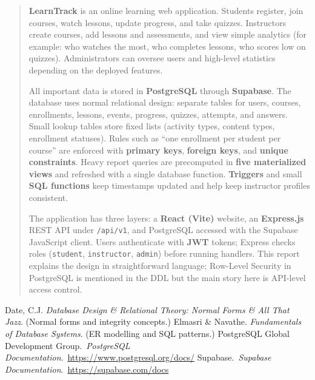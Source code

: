 \documentclass[12pt,a4paper]{report}
\begin{document}
\begin{abstract}
\textbf{LearnTrack} is an online learning web application. Students register, join courses, watch lessons, update progress, and take quizzes. Instructors create courses, add lessons and assessments, and view simple analytics (for example: who watches the most, who completes lessons, who scores low on quizzes). Administrators can oversee users and high-level statistics depending on the deployed features.

All important data is stored in \textbf{PostgreSQL} through \textbf{Supabase}. The database uses normal relational design: separate tables for users, courses, enrollments, lessons, events, progress, quizzes, attempts, and answers. Small lookup tables store fixed lists (activity types, content types, enrollment statuses). Rules such as ``one enrollment per student per course'' are enforced with \textbf{primary keys}, \textbf{foreign keys}, and \textbf{unique constraints}. Heavy report queries are precomputed in \textbf{five materialized views} and refreshed with a single database function. \textbf{Triggers} and small \textbf{SQL functions} keep timestamps updated and help keep instructor profiles consistent.

The application has three layers: a \textbf{React (Vite)} website, an \textbf{Express.js} REST API under \texttt{/api/v1}, and PostgreSQL accessed with the Supabase JavaScript client. Users authenticate with \textbf{JWT} tokens; Express checks roles (\texttt{student}, \texttt{instructor}, \texttt{admin}) before running handlers. This report explains the design in straightforward language; Row-Level Security in PostgreSQL is mentioned in the DDL but the main story here is API-level access control.

\end{abstract}

\tableofcontents
\newpage


















\begin{thebibliography}{9}
Date, C.J. \textit{Database Design \& Relational Theory: Normal Forms \& All That Jazz}. (Normal forms and integrity concepts.)
Elmasri \& Navathe. \textit{Fundamentals of Database Systems}. (ER modelling and SQL patterns.)
PostgreSQL Global Development Group.\ \textit{PostgreSQL Documentation}.\ 
\url{https://www.postgresql.org/docs/}
Supabase.\ \textit{Supabase Documentation}.\ 
\url{https://supabase.com/docs}
\end{thebibliography}


\end{document}
